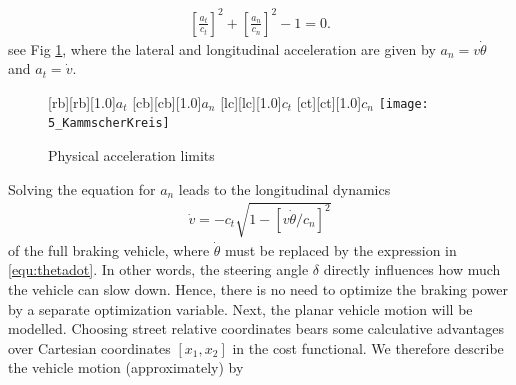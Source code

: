 \begin{align} \label{equ:ellipse}
\left[\frac{a_t}{c_t}\right]^2 + \left[\frac{a_n}{c_n}\right]^2 -1 = 0.
\end{align}
see Fig \ref{fig:kammscherKreis}, where the lateral and longitudinal acceleration are given by $a_n=v \dot{\theta}$ and $a_t=\dot{v}$.
\begin{figure}[h]%
\centering
    [rb][rb][1.0]{$a_t$}
    [cb][cb][1.0]{$a_n$}
    [lc][lc][1.0]{$c_t$}
    [ct][ct][1.0]{$c_n$}
    \texttt{[image: 5\_KammscherKreis]}
    \caption[Physical acceleration limits]{Physical acceleration limits}
    \label{fig:kammscherKreis}
\end{figure}%
Solving the equation for $a_n$ leads to the longitudinal dynamics 
\begin{align} \label{equ:replacement}
	\dot v = -c_t \sqrt{1-[v\dot\theta / c_n]^2}
\end{align}
of the full braking vehicle, where $\dot{\theta}$ must be replaced by the expression in \eqref{equ:thetadot}. 
In other words, the steering angle $\delta$ directly influences how much the vehicle can slow down. 
Hence, there is no need to optimize the braking power by a separate optimization variable. 
Next, the planar vehicle motion will be modelled. 
Choosing street relative coordinates bears some calculative advantages over Cartesian coordinates $[x_1,x_2]$ in the cost functional. We therefore describe the vehicle motion (approximately) by

